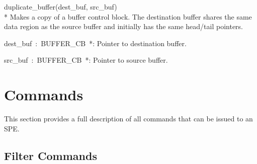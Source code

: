 \begin{description}
\item \textsf{duplicate\_buffer(dest\_buf, src\_buf)} \\*
Makes a copy of a buffer control block. The destination buffer shares the same data region as the source buffer and initially has the same head/tail pointers.
\begin{description}
\item \textsf{dest\_buf~:~BUFFER\_CB~*}: Pointer to destination buffer.
\item \textsf{src\_buf~:~BUFFER\_CB~*}: Pointer to source buffer.
\end{description}

\end{description}

\section{Commands}\label{app:ui:cmd}

This section provides a full description of all commands that can be issued to an SPE.

\subsection{Filter Commands}

